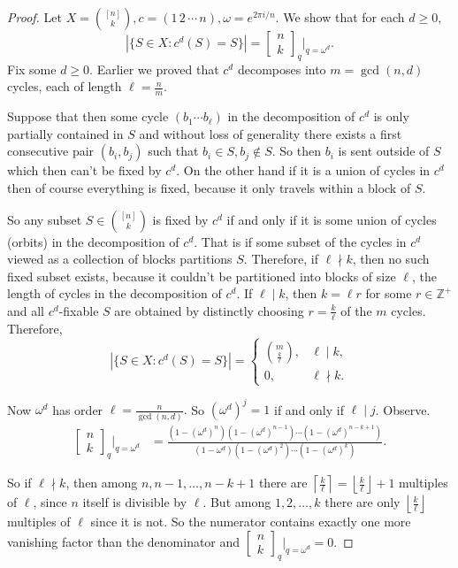 \documentclass[addpoints,10pt]{exam}
\theoremstyle{plain}
\theoremstyle{definition}
\theoremstyle{plain}
\theoremstyle{plain}
\theoremstyle{definition}
\newcommand{\ZZ}{\ensuremath{\mathbb{Z}}}
\begin{document}
\begin{proof}
Let $X=\binom{[n]}{k}, c=(1\,2\,\cdots\,n), \omega=e^{2\pi i/n}$. We show that for each $d\geq 0$,
$$
\left|\{S\in X:c^d(S)=S\}\right|
=
\begin{bmatrix}n\\ k\end{bmatrix}_{q}\Big|_{q=\omega^d}.
$$
Fix some $d\geq 0$. Earlier we proved that $c^d$ decomposes into $m=\gcd(n,d)$ cycles, each of length $\ell=\frac{n}{m}$.

Suppose that then some cycle $(b_{1}\cdots b_{\ell})$ in the decomposition of $c^{d}$ is only partially contained in $S$ and without loss of generality there exists a first consecutive pair $(b_{i},b_{j})$ such that $b_{i}\in S,b_{j}\notin S$. So then $b_{i}$ is sent outside of $S$ which then can't be fixed by $c^{d}$. On the other hand if it is a union of cycles in $c^{d}$ then of course everything is fixed, because it only travels within a block of $S$.

So any subset \(S\in \binom{[n]}{k}\) is fixed by \(c^d\) if and only if it is some union of cycles (orbits) in the decomposition of $c^d$. That is if some subset of the cycles in $c^{d}$ viewed as a collection of blocks partitions $S$. Therefore, if \(\ell\nmid k\), then no such fixed subset exists, because it couldn't be partitioned into blocks of size $\ell$, the length of cycles in the decomposition of $c^{d}$. If \(\ell\mid k\), then \(k=\ell r\) for some $r\in \ZZ^{+}$ and all $c^{d}$-fixable \(S\) are obtained by distinctly choosing \(r=\frac{k}{\ell}\) of the \(m\) cycles. Therefore,
\[
\left|\{S\in X:c^d(S)=S\}\right|
=
\begin{cases}
\binom{m}{\frac{k}{\ell}}, & \ell\mid k,\\
0, & \ell\nmid k.
\end{cases}
\]

Now \(\omega^d\) has order $\ell=\frac{n}{\gcd(n,d)}.$ So \((\omega^d)^j=1\) if and only if \(\ell\mid j\). Observe.
\begin{align*}
\begin{bmatrix}n\\ k\end{bmatrix}_{q}\Big|_{q=\omega^d}
&=
\frac{(1-(\omega^d)^n)(1-(\omega^d)^{n-1})\cdots(1-(\omega^d)^{n-k+1})}
{(1-\omega^d)(1-(\omega^d)^2)\cdots(1-(\omega^d)^k)}.
\end{align*}

So if \(\ell\nmid k\), then among
\(
n,n-1,\dots,n-k+1
\)
there are
\(
\left\lceil \frac{k}{\ell}\right\rceil
=
\left\lfloor \frac{k}{\ell}\right\rfloor+1
\)
multiples of \(\ell\), since \(n\) itself is divisible by \(\ell\). But among
\(
1,2,\dots,k
\)
there are only
\(
\left\lfloor \frac{k}{\ell}\right\rfloor
\)
multiples of \(\ell\) since it is not. So the numerator contains exactly one more vanishing factor than the denominator and $\begin{bmatrix}n\\ k\end{bmatrix}_{q}\Big|_{q=\omega^d}=0.$


\end{proof}
\end{document}
